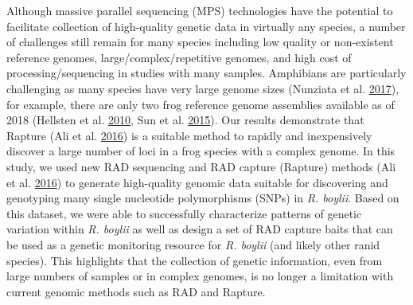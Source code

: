 \documentclass[proquest,12pt,final]{ucthesis-CA2012} %
\begin{document}
\begin{ucmainmatter}
Although massive parallel sequencing (MPS) technologies have the
potential to facilitate collection of high-quality genetic data in
virtually any species, a number of challenges still remain for many
species including low quality or non-existent reference genomes,
large/complex/repetitive genomes, and high cost of processing/sequencing
in studies with many samples. Amphibians are particularly challenging as
many species have very large genome sizes (Nunziata et al.
\protect\hyperlink{ref-nunziata_genomic_2017}{2017}), for example, there
are only two frog reference genome assemblies available as of 2018
(Hellsten et al. \protect\hyperlink{ref-hellsten_genome_2010}{2010}, Sun
et al. \protect\hyperlink{ref-sun_whole-genome_2015}{2015}). Our results
demonstrate that Rapture (Ali et al.
\protect\hyperlink{ref-ali_rad_2016}{2016}) is a suitable method to
rapidly and inexpensively discover a large number of loci in a frog
species with a complex genome. In this study, we used new RAD sequencing
and RAD capture (Rapture) methods (Ali et al.
\protect\hyperlink{ref-ali_rad_2016}{2016}) to generate high-quality
genomic data suitable for discovering and genotyping many single
nucleotide polymorphisms (SNPs) in \emph{R. boylii}. Based on this
dataset, we were able to successfully characterize patterns of genetic
variation within \emph{R. boylii} as well as design a set of RAD capture
baits that can be used as a genetic monitoring resource for \emph{R.
boylii} (and likely other ranid species). This highlights that the
collection of genetic information, even from large numbers of samples or
in complex genomes, is no longer a limitation with current genomic
methods such as RAD and Rapture.


\end{ucmainmatter}
\end{document}
